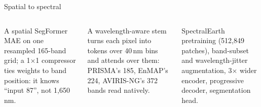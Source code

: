 \documentclass[aspectratio=169,10pt]{beamer}
\newcommand{\tx}[1]{{\fontsize{6.6}{7.9}\selectfont #1\par}}
\begin{document}
\begin{frame}{Spatial to spectral}
\centering

\vspace{0.6mm}
\begin{columns}[T,onlytextwidth]
\par\vspace{0.2mm}
\tx{A spatial SegFormer MAE on one resampled 165-band grid; a 1$\times$1 compressor ties weights to band position: it knows ``input 87'', not 1,650\,nm.}
\par\vspace{0.2mm}
\tx{A wavelength-aware stem turns each pixel into tokens over 40\,nm bins and attends over them: PRISMA's 185, EnMAP's 224, AVIRIS-NG's 372 bands read natively.}
\par\vspace{0.2mm}
\tx{SpectralEarth pretraining (512,849 patches), band-subset and wavelength-jitter augmentation, 3$\times$ wider encoder, progressive decoder, segmentation head.}
\end{columns}
\end{frame}
\end{document}
